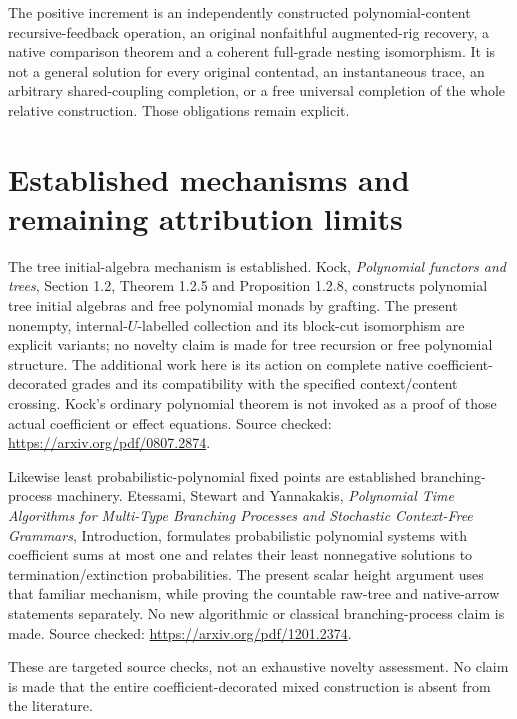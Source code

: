 \documentclass[11pt]{article}
\begin{document}
The positive increment is an independently constructed polynomial-content recursive-feedback operation, an original nonfaithful augmented-rig recovery, a native comparison theorem and a coherent full-grade nesting isomorphism. It is not a general solution for every original contentad, an instantaneous trace, an arbitrary shared-coupling completion, or a free universal completion of the whole relative construction. Those obligations remain explicit.
\section{Established mechanisms and remaining attribution limits}
The tree initial-algebra mechanism is established. Kock, \emph{Polynomial functors and trees}, Section 1.2, Theorem 1.2.5 and Proposition 1.2.8, constructs polynomial tree initial algebras and free polynomial monads by grafting. The present nonempty, internal-$U$-labelled collection and its block-cut isomorphism are explicit variants; no novelty claim is made for tree recursion or free polynomial structure. The additional work here is its action on complete native coefficient-decorated grades and its compatibility with the specified context/content crossing. Kock's ordinary polynomial theorem is not invoked as a proof of those actual coefficient or effect equations. Source checked: \url{https://arxiv.org/pdf/0807.2874}.

Likewise least probabilistic-polynomial fixed points are established branching-process machinery. Etessami, Stewart and Yannakakis, \emph{Polynomial Time Algorithms for Multi-Type Branching Processes and Stochastic Context-Free Grammars}, Introduction, formulates probabilistic polynomial systems with coefficient sums at most one and relates their least nonnegative solutions to termination/extinction probabilities. The present scalar height argument uses that familiar mechanism, while proving the countable raw-tree and native-arrow statements separately. No new algorithmic or classical branching-process claim is made. Source checked: \url{https://arxiv.org/pdf/1201.2374}.

These are targeted source checks, not an exhaustive novelty assessment. No claim is made that the entire coefficient-decorated mixed construction is absent from the literature.
\end{document}

